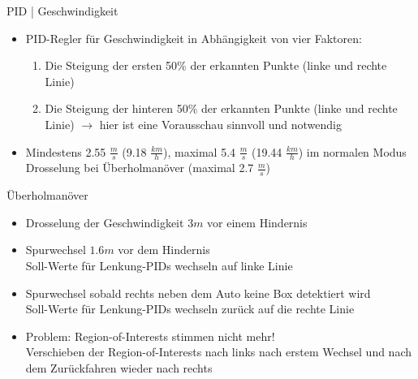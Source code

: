 \documentclass[aspectratio=169]{beamer}
\begin{document}
\begin{frame}{PID | Geschwindigkeit}
	\begin{itemize}
		\item PID-Regler für Geschwindigkeit in Abhängigkeit von vier Faktoren:
		      \begin{enumerate}
			      \item Die Steigung der ersten 50\% der erkannten Punkte (linke und rechte Linie)
			      \item Die Steigung der hinteren 50\% der erkannten Punkte (linke und rechte Linie) $\rightarrow$ hier ist eine Vorausschau sinnvoll und notwendig
		      \end{enumerate}
		\item Mindestens 2.55 $\frac{m}{s}$ (9.18 $\frac{km}{h}$), maximal 5.4 $\frac{m}{s}$ (19.44 $\frac{km}{h}$) im normalen Modus\\
		       Drosselung bei Überholmanöver (maximal 2.7 $\frac{m}{s}$)
	\end{itemize}
\end{frame}

\begin{frame}{Überholmanöver}
	\begin{itemize}
		\item Drosselung der Geschwindigkeit $3m$ vor einem Hindernis
		\item Spurwechsel $1.6m$ vor dem Hindernis\\
		       Soll-Werte für Lenkung-PIDs wechseln auf linke Linie
		\item Spurwechsel sobald rechts neben dem Auto keine Box detektiert wird\\
		       Soll-Werte für Lenkung-PIDs wechseln zurück auf die rechte Linie
		\item Problem: Region-of-Interests stimmen nicht mehr!\\
		       Verschieben der Region-of-Interests nach links nach erstem Wechsel und nach dem Zurückfahren wieder nach rechts
	\end{itemize}
\end{frame}
\end{document}
